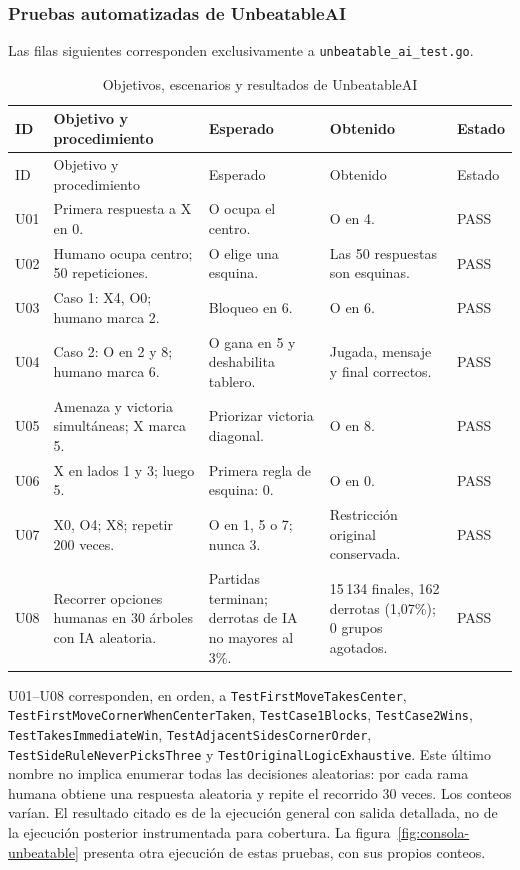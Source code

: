 \documentclass[12pt,a4paper]{article}
\begin{document}
\subsubsection{Pruebas automatizadas de UnbeatableAI}
Las filas siguientes corresponden exclusivamente a \texttt{unbeatable\_ai\_test.go}.
\begin{longtable}{p{1cm}p{3.4cm}p{3.3cm}p{3.4cm}p{1.6cm}}
\caption{Objetivos, escenarios y resultados de UnbeatableAI}\\
\toprule ID & Objetivo y procedimiento & Esperado & Obtenido & Estado\\\midrule\endfirsthead
\toprule ID & Objetivo y procedimiento & Esperado & Obtenido & Estado\\\midrule\endhead
U01 & Primera respuesta a X en 0. & O ocupa el centro. & O en 4. & PASS\\
U02 & Humano ocupa centro; 50 repeticiones. & O elige una esquina. & Las 50 respuestas son esquinas. & PASS\\
U03 & Caso 1: X4, O0; humano marca 2. & Bloqueo en 6. & O en 6. & PASS\\
U04 & Caso 2: O en 2 y 8; humano marca 6. & O gana en 5 y deshabilita tablero. & Jugada, mensaje y final correctos. & PASS\\
U05 & Amenaza y victoria simultáneas; X marca 5. & Priorizar victoria diagonal. & O en 8. & PASS\\
U06 & X en lados 1 y 3; luego 5. & Primera regla de esquina: 0. & O en 0. & PASS\\
U07 & X0, O4; X8; repetir 200 veces. & O en 1, 5 o 7; nunca 3. & Restricción original conservada. & PASS\\
U08 & Recorrer opciones humanas en 30 árboles con IA aleatoria. & Partidas terminan; derrotas de IA no mayores al 3\%. & 15\,134 finales, 162 derrotas (1,07\%); 0 grupos agotados. & PASS\\
\bottomrule
\end{longtable}
U01--U08 corresponden, en orden, a \texttt{TestFirstMoveTakesCenter},
\texttt{TestFirstMoveCornerWhenCenterTaken}, \texttt{TestCase1Blocks},
\texttt{TestCase2Wins}, \texttt{TestTakesImmediateWin},
\texttt{TestAdjacentSidesCornerOrder}, \texttt{TestSideRuleNeverPicksThree} y
\texttt{TestOriginalLogicExhaustive}. Este último nombre no implica enumerar todas
las decisiones aleatorias: por cada rama humana obtiene una respuesta aleatoria
y repite el recorrido 30 veces. Los conteos varían. El resultado citado es de la
ejecución general con salida detallada, no de la ejecución posterior instrumentada para cobertura.
La figura~\ref{fig:consola-unbeatable} presenta otra ejecución de estas pruebas, con sus propios conteos.
\end{document}
